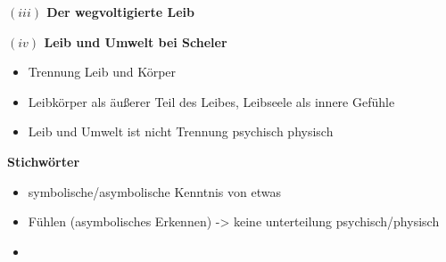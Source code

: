 \documentclass[a4paper, 12pt]{article}
\begin{document}
\begin{onehalfspace}
\vspace{5mm}
\noindent\textbf{$(iii)$ Der wegvoltigierte Leib}

\vspace{5mm}
\noindent\textbf{$(iv)$ Leib und Umwelt bei Scheler}

\begin{itemize}
  \item Trennung Leib und Körper
  \item Leibkörper als äußerer Teil des Leibes, Leibseele als innere Gefühle
  \item Leib und Umwelt ist nicht Trennung psychisch physisch
\end{itemize}


\vspace{5mm}
\noindent\textbf{Stichwörter}
\begin{itemize}
  \item symbolische/asymbolische Kenntnis von etwas
  \item Fühlen (asymbolisches Erkennen) -> keine unterteilung psychisch/physisch
  \item 
\end{itemize}


\newpage

\end{onehalfspace}
\nocite{*}
\printbibliography
\end{document}
